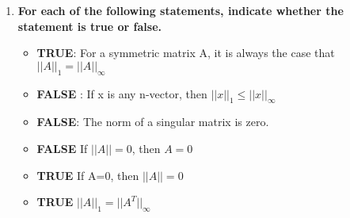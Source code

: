 \documentclass[12pt, oneside]{article}   	%
\begin{document}
\begin{enumerate}
\begin{enumerate}
\begin{enumerate}
	\end{enumerate}
	
	\item \textbf{For each of the following statements, indicate whether the statement is true or false.}
	\begin{itemize}
		\item 	\textbf{TRUE}: For a symmetric matrix A, it is always the case that $||A||_1 = ||A||_\infty$ 
		\item \textbf{FALSE} : If x is any n-vector, then $||x||_1 \leq ||x||_\infty$ 
		\item \textbf{FALSE}: The norm of a singular matrix is zero.
		\item \textbf{FALSE} If $||A|| = 0$, then $A=0$
		\item\textbf{TRUE} If A=0, then $||A|| = 0$
		\item \textbf{TRUE} $||A||_1 = ||A^T||_\infty$
	\end{itemize}

	
	
	
\end{enumerate}
\end{enumerate}
\end{document}
